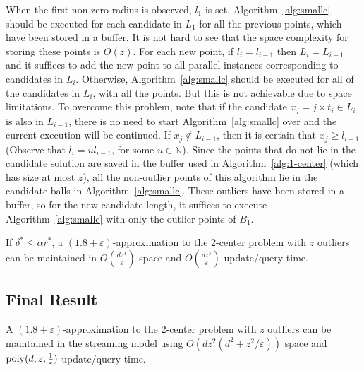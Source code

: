 \documentclass[envcountsame]{cls/cccg15}
\renewcommand{\O}{\ensuremath{{O}}}
\newcommand{\poly}{\mathop{\mathrm{poly}}}
\newcommand{\lee}{\leqslant}
\newcommand{\gee}{\geqslant}
\renewcommand{\leq}{\lee}
\renewcommand{\ge}{\gee}
\newcommand{\eps}{\varepsilon}
\begin{document}
When the first non-zero radius is observed, $l_1$ is set. Algorithm~\ref{alg:smallc} should be executed for each candidate in $L_1$ for all the previous points, which have been stored in a buffer. It is not hard to see that the space complexity for storing these points is $\O(z)$. For each new point, if $l_i=l_{i-1}$ then $L_i = L_{i-1}$ and it suffices to add the new point to all parallel instances corresponding to candidates in $L_i$. Otherwise, Algorithm~\ref{alg:smallc} should be executed for all of the candidates in $L_i$, with all the points. But this is not achievable due to space limitations. To overcome this problem, note that if the candidate $x_j=j \times t_i \in L_i$ is also in $L_{i-1}$, there is no need to start Algorithm~\ref{alg:smallc} over and the current execution will be continued. If $x_j \notin L_{i-1}$, then it is certain that $x_j \ge l_{i - 1}$ (Observe that $l_i=ul_{i-1}$, for some $u\in \mathbb{N}$). Since the points that do not lie in the candidate solution are saved in the buffer used in Algorithm~\ref{alg:1-center} (which has size at most $z$), all the non-outlier points of this algorithm lie in the candidate balls in Algorithm~\ref{alg:smallc}. These outliers have been stored in a buffer, so for the new candidate length, it suffices to execute Algorithm~\ref{alg:smallc} with only the outlier points of $B_1$.


\begin{theorem}
\label{thm:close-cmplx}
	If $\delta^* \leq \alpha r^*$, a $(1.8 + \eps)$-approximation to the 2-center problem with $z$ outliers 
	can be maintained in $\O(\frac{dz^4}{\eps})$ space 
	and $\O(\frac{dz^3}{\eps})$ update/query time.
\end{theorem}

\subsection{Final Result}

\begin{theorem}
	A $(1.8 + \eps)$-approximation to the 2-center problem with $z$ outliers
	can be maintained in the streaming model using 
	$\O(dz^2 (d^2 + z^2/\eps))$ space and 
	$\poly(d, z, {1 \over \eps})$ update/query time.
\end{theorem}
\end{document}
